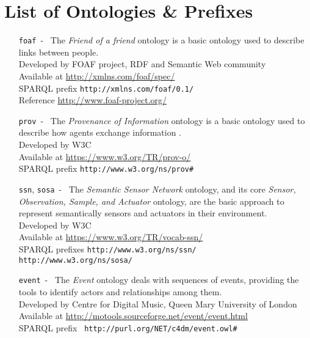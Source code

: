 \documentclass[11pt, twoside, openright]{report}   	%
\begin{document}
\chapter*{List of Ontologies \& Prefixes}
\label{sec:ontology_list}
\small
\begin{enumerate}
\itemsep15pt
\renewcommand{\labelenumi}{\textbf{\theenumi}}
\item[\texttt{foaf}~-~] The \textit{Friend of a friend} ontology is a basic ontology used to describe links between people. \\
Developed by \hfill FOAF project, RDF and Semantic Web community \\
Available at \hfill \url{http://xmlns.com/foaf/spec/} \\
SPARQL prefix \hfill \texttt{http://xmlns.com/foaf/0.1/} \\
Reference \hfill \url{http://www.foaf-project.org/}

\item[\texttt{prov}~-~] The \textit{Provenance of Information} ontology is a basic ontology used to describe how agents exchange information . \\
Developed by \hfill W3C \\
Available at \hfill \url{https://www.w3.org/TR/prov-o/} \\
SPARQL prefix \hfill \texttt{http://www.w3.org/ns/prov\#}

\item[\texttt{ssn}, \texttt{sosa}~-~] The \textit{Semantic Sensor Network} ontology, and its core \textit{Sensor, Observation, Sample, and Actuator} ontology, are the basic approach to represent semantically sensors and actuators in their environment. \\
Developed by \hfill W3C \\
Available at \hfill \url{https://www.w3.org/TR/vocab-ssn/} \\
SPARQL prefixes \hfill \texttt{http://www.w3.org/ns/ssn/} \\
\null \hfill \texttt{http://www.w3.org/ns/sosa/}

\item[\texttt{event}~-~] The \textit{Event} ontology deals with sequences of events, providing the tools to identify actors and relationships among them. \\
Developed by \hfill Centre for Digital Music, Queen Mary University of London \\
Available at \hfill \url{http://motools.sourceforge.net/event/event.html} \\
SPARQL prefix \hfill \texttt{
http://purl.org/NET/c4dm/event.owl\#}


\end{enumerate}
\end{document}

